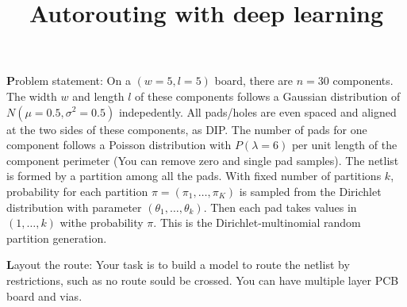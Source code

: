 \documentclass{article}
\begin{document}
\title{Autorouting with deep learning}
\maketitle

{\textbf Problem statement:}
On a $(w=5, l=5)$ board, there are $n=30$ components.
The width $w$ and length $l$ of these components follows
a Gaussian distribution of $N(\mu=0.5, \sigma^2=0.5)$ indepedently.
All pads/holes are even spaced and aligned at the two sides of these components, as DIP.
The number of pads for one component
follows a Poisson distribution with $P(\lambda = 6)$ per unit length of the component perimeter (You can remove zero and single pad samples).
The netlist is formed by a partition among all the pads.
With fixed number of partitions $k$, probability for each partition $\pi = (\pi_1, \dots, \pi_K)$ is sampled from the Dirichlet distribution with parameter $(\theta_1, \dots, \theta_k)$.
Then each pad takes values in $(1, \dots, k)$ withe probability $\pi$.
This is the Dirichlet-multinomial random partition generation.

{\textbf Layout the route:}
Your task is to build a model to route the netlist by restrictions, such as no route sould be crossed.
You can have multiple layer PCB board and vias.



 
\end{document}

